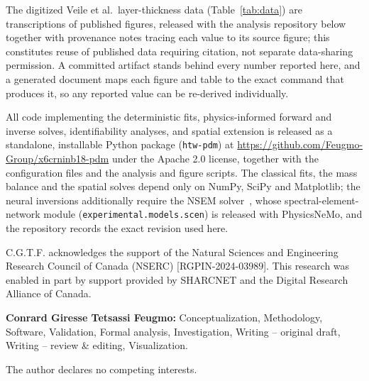 \documentclass[pdflatex,sn-nature]{sn-jnl}
\begin{document}
\backmatter


The digitized Veile et al.\ layer-thickness data
(Table~\ref{tab:data}) are transcriptions of published figures,
released with the analysis repository below together with provenance
notes tracing each value to its source figure; this constitutes reuse of
published data requiring citation, not separate data-sharing permission.
A committed artifact stands behind every number reported here, and a
generated document maps each figure and table to the exact command that
produces it, so any reported value can be re-derived individually.


All code implementing the deterministic fits, physics-informed forward
and inverse solves, identifiability analyses, and spatial extension is
released as a standalone, installable Python package
(\texttt{htw-pdm}) at
\url{https://github.com/Feugmo-Group/x6crninb18-pdm} under the Apache
2.0 license, together with the configuration files and the analysis and
figure scripts. The classical fits, the mass balance and the spatial
solves depend only on NumPy, SciPy and Matplotlib; the neural inversions
additionally require the NSEM solver~\citep{feugmo2026nsem}, whose
spectral-element-network module
(\texttt{experimental.\allowbreak models.\allowbreak scen}) is
released with PhysicsNeMo, and the repository records the exact revision
used here.


C.G.T.F. acknowledges the support of the Natural Sciences and
Engineering Research Council of Canada (NSERC)
[RGPIN-2024-03989]. This research was enabled in part by support
provided by SHARCNET and the Digital Research Alliance of Canada.


\textbf{Conrard Giresse Tetsassi Feugmo:} Conceptualization,
Methodology, Software, Validation, Formal analysis, Investigation,
Writing -- original draft, Writing -- review \& editing, Visualization.


The author declares no competing interests.


\end{document}

